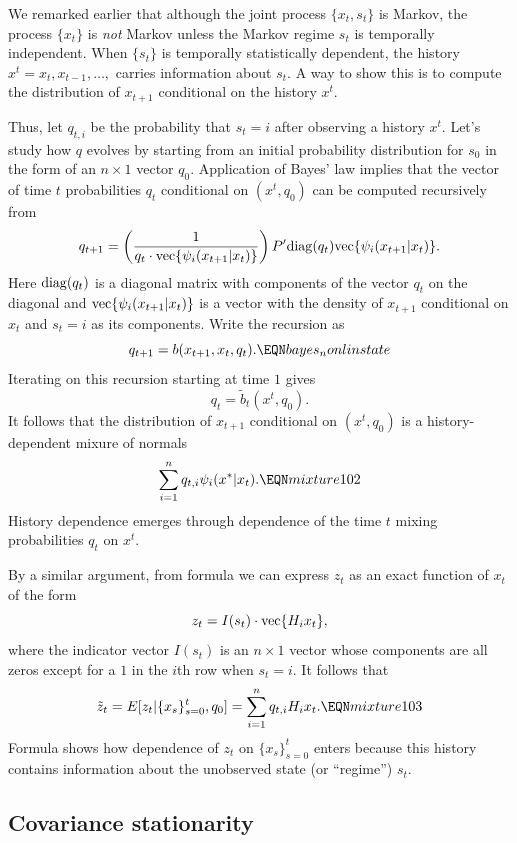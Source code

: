 We  remarked earlier  that although  the joint process $\{x_t, s_t\}$ is 
 Markov,  the process $\{x_t\}$ is {\it not} Markov unless the Markov regime $s_t$ is temporally independent. When $\{s_t\}$ is temporally statistically dependent,
the history  
$x^t = x_t, x_{t-1}, \ldots, $ 
 carries information about $s_t$.  
   A  way to show this
is to compute the distribution of $x_{t+1}$ conditional on the history $x^t$.   
 
Thus, let $q_{t,i} $ be the probability that $s_t = i$ after observing a history $x^t$. Let's study 
how $q$ evolves by  starting from 
an initial probability distribution  for $s_0$ in the form of an $n \times 1$ vector $q_0$. 
 Application of Bayes' law implies that the vector of 
time $t$ probabilities 
$q_t$  conditional on $(x^t, q_0)$  can be computed recursively from 
    $$ q_{t+1} = \left( {\frac{1}{q_t \cdot {\rm vec}\{\psi_i(x_{t+1}|x_t)\} } } \right)
        P' {\rm diag}(q_t) {\rm vec}\{\psi_i(x_{t+1}|x_t)\}. $$ Here ${\rm diag}(q_t)$ is a diagonal matrix 
        with components of the vector  $q_t$ on the diagonal and   ${\rm vec}\{\psi_i(x_{t+1}|x_t)\}$
        is a vector with the density of $x_{t+1}$ conditional on $x_t$ and $s_t =i$ as its components.
Write the recursion as 
$$ q_{t+1} = b(x_{t+1}, x_t, q_t). \EQN bayes_nonlinstate $$
Iterating on this recursion starting at time $1$ gives
$$ q_{t} = \tilde b_t(x^t, q_0) . $$
It follows that the distribution of $x_{t+1} $ conditional on $(x^t, q_0)$ is a history-dependent mixure of normals
$$ \sum_{i=1}^n q_{t,i} \psi_i(x^* | x_t). \EQN mixture102 $$
History dependence emerges  through  dependence of the time $t$ mixing probabilities $q_t$ on $x^t$.

By a similar argument, from formula  we can express    $z_t$ as an  exact function %
of $x_t$ of the form 
$$ z_t = I(s_t) \cdot {\rm vec} \{ H_i x_t \} , $$
where the indicator vector $I(s_t)$ is an $n \times 1$ vector whose components are  all zeros except for a $1$ in the $i$th row when $s_t=i$.  It follows  that 
$$ \tilde z_t = E [ z_t |  \{x_s\}_{s=0}^t, q_0]  = \sum_{i=1}^n  q_{t,i} H_i x_t.  \EQN mixture103 $$
Formula  shows how dependence of $z_t$ on   $ \{x_s\}_{s=0}^t$ enters because this history   contains information
about the unobserved state (or ``regime'') $s_t$. 


\subsection{Covariance stationarity}

